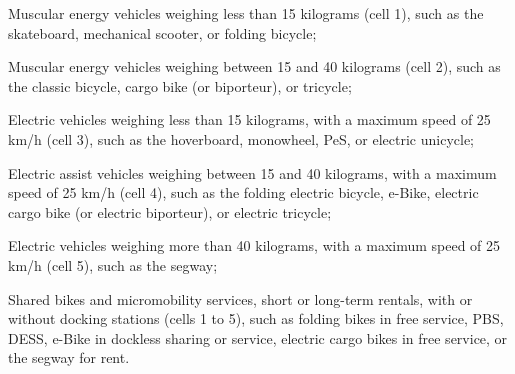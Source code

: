 \begin{refsegment}
    \begin{customitemize}
\item Muscular energy vehicles weighing less than 15 kilograms (cell 1), such as the skateboard, mechanical scooter, or folding bicycle;
\item Muscular energy vehicles weighing between 15 and 40 kilograms (cell 2), such as the classic bicycle, cargo bike (or biporteur), or tricycle;
\item Electric vehicles weighing less than 15 kilograms, with a maximum speed of 25 km/h (cell 3), such as the hoverboard, monowheel, \acrshort{PeS}, or electric unicycle;
\item Electric assist vehicles weighing between 15 and 40 kilograms, with a maximum speed of 25 km/h (cell 4), such as the folding electric bicycle, \acrshort{e-Bike}, electric cargo bike (or electric biporteur), or electric tricycle;
\item Electric vehicles weighing more than 40 kilograms, with a maximum speed of 25 km/h (cell 5), such as the segway;
\item Shared bikes and micromobility services, short or long-term rentals, with or without docking stations (cells 1 to 5), such as folding bikes in free service, \acrshort{PBS}, \acrshort{DESS}, \acrshort{e-Bike} in dockless sharing or service, electric cargo bikes in free service, or the segway for rent.
    \end{customitemize}%


\end{refsegment}
